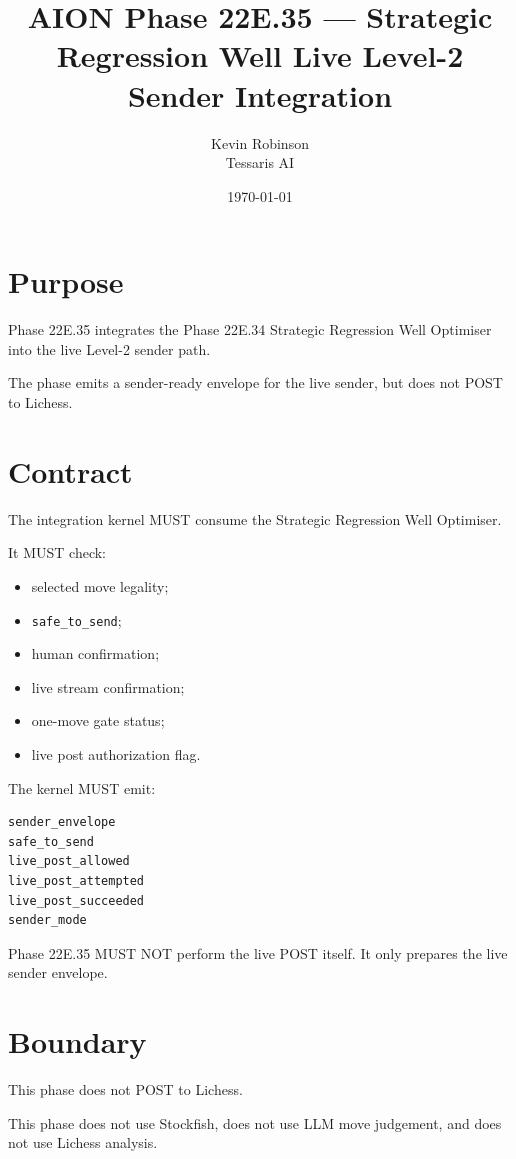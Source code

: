 \documentclass[11pt,a4paper]{article}
\title{\textbf{AION Phase 22E.35 --- Strategic Regression Well Live Level-2 Sender Integration}}
\author{Kevin Robinson\\Tessaris AI}
\date{\today}
\begin{document}
\maketitle

\section{Purpose}

Phase 22E.35 integrates the Phase 22E.34 Strategic Regression Well Optimiser into the live Level-2 sender path.

The phase emits a sender-ready envelope for the live sender, but does not POST to Lichess.

\section{Contract}

The integration kernel MUST consume the Strategic Regression Well Optimiser.

It MUST check:

\begin{itemize}[leftmargin=*]
  \item selected move legality;
  \item \texttt{safe\_to\_send};
  \item human confirmation;
  \item live stream confirmation;
  \item one-move gate status;
  \item live post authorization flag.
\end{itemize}

The kernel MUST emit:

\begin{verbatim}
sender_envelope
safe_to_send
live_post_allowed
live_post_attempted
live_post_succeeded
sender_mode
\end{verbatim}

Phase 22E.35 MUST NOT perform the live POST itself. It only prepares the live sender envelope.

\section{Boundary}

This phase does not POST to Lichess.

This phase does not use Stockfish, does not use LLM move judgement, and does not use Lichess analysis.
\end{document}
